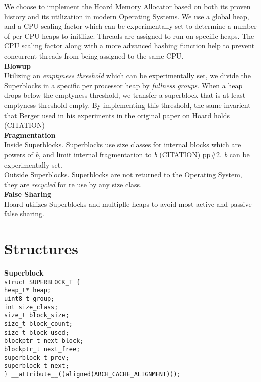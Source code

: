 \documentclass[11pt]{article}
\begin{document}
\indent \indent We choose to implement the Hoard Memory Allocator based on both its proven history and its utilization in modern Operating Systems.  We use a global heap, and a CPU scaling factor which can be experimentally set to determine a number of per CPU heaps to initilize.  Threads are assigned to run on specific heaps.  The CPU scaling factor along with a more advanced hashing function help to prevent concurrent threads from being assigned to the same CPU.
\\
\newpage
\noindent
\textbf{Blowup}
\\
\indent  Utilizing an \textit{emptyness threshold} which can be experimentally set, we divide the Superblocks in a specific per processor heap by \textit{fullness groups}.  When a heap drops below the emptyness threshold, we transfer a superblock that is at least emptyness threshold empty.  By implementing this threshold, the same invarient that Berger used in his experiments in the original paper on Hoard holds (CITATION)
\\
\textbf{Fragmentation}
\\
\indent Inside Superblocks.  Superblocks use size classes for internal blocks which are powers of \textit{b}, and limit internal fragmentation to \textit{b} (CITATION) pp\#2. \textit{b} can be experimentally set.
\\
\indent Outside Superblocks.  Superblocks are not returned to the Operating System, they are \textit{recycled} for re use by any size class.
\\
\textbf{False Sharing}
\\
\indent Hoard utilizes Superblocks and multiplle heaps to avoid most active and passive false sharing. 



\section{Structures}

\textbf{Superblock}
\texttt{
\\
struct SUPERBLOCK\_T \{
\\
    heap\_t* heap;
\\
    uint8\_t group;
\\
    int size\_class;
\\
    size\_t block\_size;
\\
    size\_t block\_count;
\\
    size\_t block\_used;
\\
    blockptr\_t next\_block;
\\
    blockptr\_t next\_free;
\\
    superblock\_t\* prev;
\\
    superblock\_t\* next;
\\
\} \_\_attribute\_\_((aligned(ARCH\_CACHE\_ALIGNMENT)));
}
\\
\\
\newpage
\end{document}

